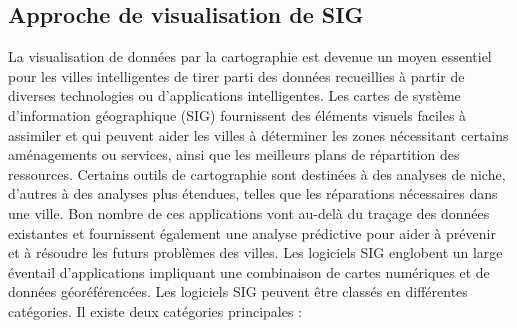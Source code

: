 \documentclass[french, a4paper, 12pt]{report}
\begin{document}
\subsection{Approche de visualisation de SIG}
La visualisation de données par la cartographie est devenue un moyen essentiel pour les villes intelligentes de tirer parti des données recueillies à partir de diverses technologies ou d’applications intelligentes. Les cartes de système d'information géographique (SIG) fournissent des éléments visuels faciles à assimiler et qui peuvent aider les villes à déterminer les zones nécessitant certains aménagements ou services, ainsi que les meilleurs plans de répartition des ressources.
Certains outils de cartographie sont destinées à des analyses de niche, d'autres à des analyses plus étendues, telles que les réparations nécessaires dans une ville. Bon nombre de ces applications vont au-delà du traçage des données existantes et fournissent également une analyse prédictive pour aider à prévenir et à résoudre les futurs problèmes des villes.
Les logiciels SIG englobent un large éventail d'applications impliquant une combinaison de cartes numériques et de données géoréférencées. Les logiciels SIG peuvent être classés en différentes catégories.
Il existe deux catégories principales \cite{15} :  
\end{document}
